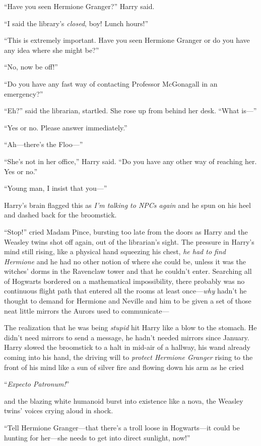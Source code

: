 “Have you seen Hermione Granger?” Harry said.

“I said the library’s \emph{closed}, boy! Lunch hours!”

“This is extremely important. Have you seen Hermione Granger or do you have any idea where she might be?”

“No, now be off!”

“Do you have any fast way of contacting Professor McGonagall in an emergency?”

“Eh?” said the librarian, startled. She rose up from behind her desk. “What is—”

“Yes or no. Please answer immediately.”

“Ah—there’s the Floo—”

“She’s not in her office,” Harry said. “Do you have any other way of reaching her. Yes or no.”

“Young man, I insist that you—”

Harry’s brain flagged this as \emph{I’m talking to NPCs again} and he spun on his heel and dashed back for the broomstick.

“Stop!” cried Madam Pince, bursting too late from the doors as Harry and the Weasley twins shot off again, out of the librarian’s sight. The pressure in Harry’s mind still rising, like a physical hand squeezing his chest, \emph{he had to find Hermione} and he had no other notion of where she could be, unless it was the witches’ dorms in the Ravenclaw tower and that he couldn’t enter. Searching all of Hogwarts bordered on a mathematical impossibility, there probably was no continuous flight path that entered all the rooms at least once—\emph{why} hadn’t he thought to demand for Hermione and Neville and him to be given a set of those neat little mirrors the Aurors used to communicate—

The realization that he was being \emph{stupid} hit Harry like a blow to the stomach. He didn’t need mirrors to send a message, he hadn’t needed mirrors since January. Harry slowed the broomstick to a halt in mid-air of a hallway, his wand already coming into his hand, the driving will to \emph{protect Hermione Granger} rising to the front of his mind like a sun of silver fire and flowing down his arm as he cried

“\emph{Expecto Patronum!}”

and the blazing white humanoid burst into existence like a nova, the Weasley twins’ voices crying aloud in shock.

“Tell Hermione Granger—that there’s a troll loose in Hogwarts—it could be hunting for her—she needs to get into direct sunlight, now!”

